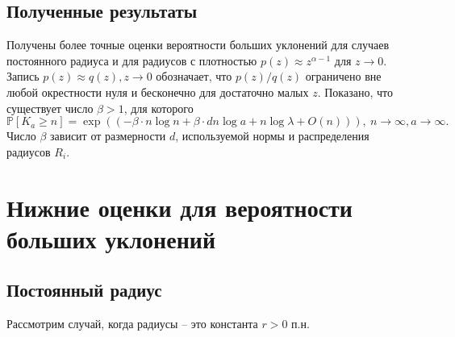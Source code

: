 \documentclass[12pt]{article}
\theoremstyle{plain}
\theoremstyle{definition}
\theoremstyle{remark}
\def\geq{\geqslant}
\newcommand{\cuplim}{\bigcup\limits}
\newcommand{\R}{\mathbb{R}}
\newcommand{\PP}{\mathbb{P}}
\newcommand{\til}{\widetilde}
\begin{document}
\subsection{Полученные результаты}
Получены более точные оценки вероятности больших уклонений для случаев постоянного радиуса и для радиусов с плотностью $p(z) \approx z^{\alpha -1}$ для $z\to 0$. Запись $p(z) \approx q(z), z\to 0$ обозначает, что $p(z)/q(z)$ ограничено вне любой окрестности нуля и бесконечно для достаточно малых $z$. Показано, что существует число $\beta >1$, для которого $$\PP[K_a \geq n] = \exp((-\beta\cdot n\log n + \beta\cdot dn\log a + n\log\lambda + O(n))), \ n\to \infty, a \to\infty.$$
Число $\beta$ зависит от размерности $d$, используемой нормы и распределения радиусов $R_i$.



%
%
%



\section{Нижние оценки для вероятности больших уклонений}

\subsection{Постоянный радиус}

Рассмотрим случай, когда радиусы -- это константа $r>0$ п.н. 
\end{document}
